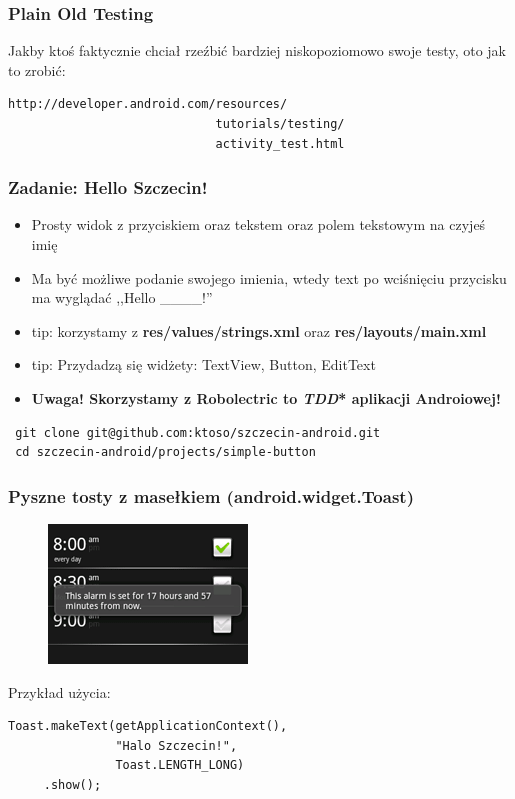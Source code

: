 \documentclass{beamer}
\begin{document}
\begin{frame}[fragile]\frametitle{Plain Old Testing}
Jakby ktoś faktycznie chciał rzeźbić bardziej niskopoziomowo swoje testy,
oto jak to zrobić: 

\begin{verbatim} 
http://developer.android.com/resources/
                             tutorials/testing/
                             activity_test.html
\end{verbatim}
\end{frame}

\begin{frame}[fragile]\frametitle{Zadanie: Hello Szczecin!}
\begin{itemize}
 \item Prosty widok z przyciskiem oraz tekstem oraz polem tekstowym na czyjeś imię
 \item Ma być możliwe podanie swojego imienia, wtedy text po wciśnięciu przycisku ma wyglądać ,,Hello \_\_\_\_!''
 \item tip: korzystamy z \textbf{res/values/strings.xml} oraz \textbf{res/layouts/main.xml}
 \item tip: Przydadzą się widżety: TextView, Button, EditText
 \item \textbf{Uwaga! Skorzystamy z \textbf{Robolectric} to \textit{TDD}* aplikacji Androiowej!}
\end{itemize}

\begin{verbatim}
 git clone git@github.com:ktoso/szczecin-android.git
 cd szczecin-android/projects/simple-button
\end{verbatim}

\end{frame}


\begin{frame}[fragile]\frametitle{Pyszne tosty z masełkiem (android.widget.Toast)}

\begin{figure}[h]
 \centering
 \includegraphics[height=0.40\textheight,keepaspectratio=true]{images/toast}
\end{figure}

 Przykład użycia: 
 \begin{lstlisting}
Toast.makeText(getApplicationContext(),
               "Halo Szczecin!", 
               Toast.LENGTH_LONG)
     .show();
 \end{lstlisting}

\end{frame}
\end{document}
